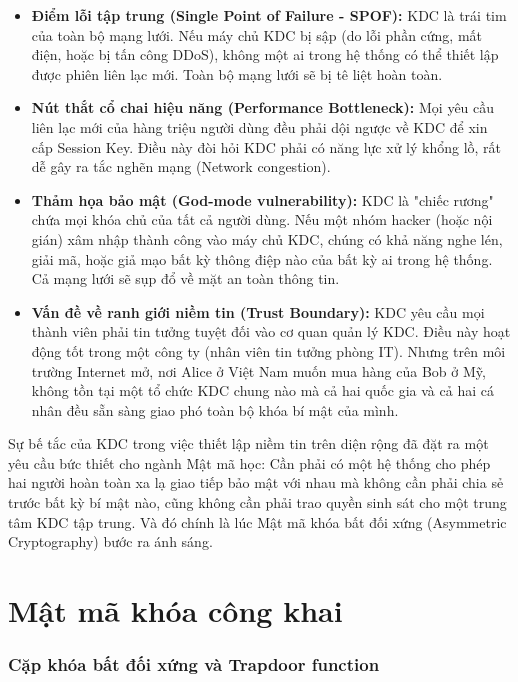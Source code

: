 \begin{itemize}
    \item \textbf{Điểm lỗi tập trung (Single Point of Failure - SPOF):} KDC là trái tim của toàn bộ mạng lưới. Nếu máy chủ KDC bị sập (do lỗi phần cứng, mất điện, hoặc bị tấn công DDoS), không một ai trong hệ thống có thể thiết lập được phiên liên lạc mới. Toàn bộ mạng lưới sẽ bị tê liệt hoàn toàn.
    \item \textbf{Nút thắt cổ chai hiệu năng (Performance Bottleneck):} Mọi yêu cầu liên lạc mới của hàng triệu người dùng đều phải dội ngược về KDC để xin cấp Session Key. Điều này đòi hỏi KDC phải có năng lực xử lý khổng lồ, rất dễ gây ra tắc nghẽn mạng (Network congestion).
    \item \textbf{Thảm họa bảo mật (God-mode vulnerability):} KDC là "chiếc rương" chứa mọi khóa chủ của tất cả người dùng. Nếu một nhóm hacker (hoặc nội gián) xâm nhập thành công vào máy chủ KDC, chúng có khả năng nghe lén, giải mã, hoặc giả mạo bất kỳ thông điệp nào của bất kỳ ai trong hệ thống. Cả mạng lưới sẽ sụp đổ về mặt an toàn thông tin.
    \item \textbf{Vấn đề về ranh giới niềm tin (Trust Boundary):} KDC yêu cầu mọi thành viên phải tin tưởng tuyệt đối vào cơ quan quản lý KDC. Điều này hoạt động tốt trong một công ty (nhân viên tin tưởng phòng IT). Nhưng trên môi trường Internet mở, nơi Alice ở Việt Nam muốn mua hàng của Bob ở Mỹ, không tồn tại một tổ chức KDC chung nào mà cả hai quốc gia và cả hai cá nhân đều sẵn sàng giao phó toàn bộ khóa bí mật của mình.
\end{itemize}

Sự bế tắc của KDC trong việc thiết lập niềm tin trên diện rộng đã đặt ra một yêu cầu bức thiết cho ngành Mật mã học: Cần phải có một hệ thống cho phép hai người hoàn toàn xa lạ giao tiếp bảo mật với nhau mà không cần phải chia sẻ trước bất kỳ bí mật nào, cũng không cần phải trao quyền sinh sát cho một trung tâm KDC tập trung. Và đó chính là lúc Mật mã khóa bất đối xứng (Asymmetric Cryptography) bước ra ánh sáng.

\section{Mật mã khóa công khai}
\label{sec:2.2}

\subsubsection*{Cặp khóa bất đối xứng và Trapdoor function}

